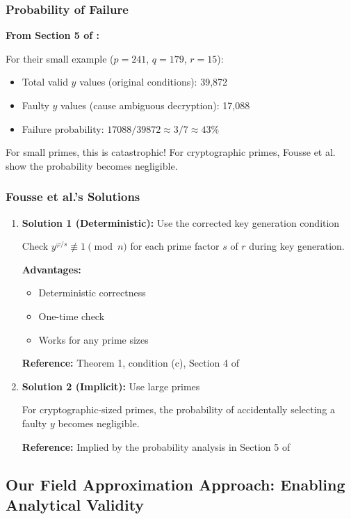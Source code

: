 \documentclass[11pt]{article}
\theoremstyle{definition}
\begin{document}
\subsubsection{Probability of Failure}

\textbf{From Section 5 of \cite{fousse2011benaloh}:}

For their small example ($p=241$, $q=179$, $r=15$):
\begin{itemize}
\item Total valid $y$ values (original conditions): 39,872
\item Faulty $y$ values (cause ambiguous decryption): 17,088
\item Failure probability: $17088/39872 \approx 3/7 \approx 43\%$ 
\end{itemize}

For small primes, this is catastrophic! For cryptographic primes, Fousse et al. show the probability becomes negligible.

\subsubsection{Fousse et al.'s Solutions}

\begin{enumerate}
\item \textbf{Solution 1 (Deterministic):} Use the corrected key generation condition

Check $y^{\varphi/s} \not\equiv 1 \pmod{n}$ for each prime factor $s$ of $r$ during key generation.

\textbf{Advantages:} 
\begin{itemize}
\item Deterministic correctness
\item One-time check
\item Works for any prime sizes
\end{itemize}

\textbf{Reference:} Theorem 1, condition (c), Section 4 of \cite{fousse2011benaloh}

\item \textbf{Solution 2 (Implicit):} Use large primes

For cryptographic-sized primes, the probability of accidentally selecting a faulty $y$ becomes negligible.

\textbf{Reference:} Implied by the probability analysis in Section 5 of \cite{fousse2011benaloh}
\end{enumerate}

\subsection{Our Field Approximation Approach: Enabling Analytical Validity}
\end{document}
